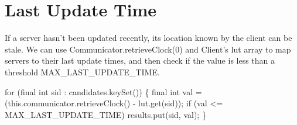 \section{Last Update Time}

If a server hasn't been updated recently, its location known by the client can
be stale. We can use {\Tt{}Communicator.retrieveClock\nwendquote}(0) and {\Tt{}Client\nwendquote}'s {\Tt{}lut\nwendquote}
array to map servers to their last update times, and then check if the value
is less than a threshold {\Tt{}MAX{\_}LAST{\_}UPDATE{\_}TIME\nwendquote}.

\nwenddocs{}\endmoddef\nwstartdeflinemarkup{}\nwenddeflinemarkup
for (final int sid : candidates.keySet()) \{
  final int val = (this.communicator.retrieveClock() - lut.get(sid));
  if (val <= MAX_LAST_UPDATE_TIME)
    results.put(sid, val);
\}
\nwendcode{}\nwdocspar


